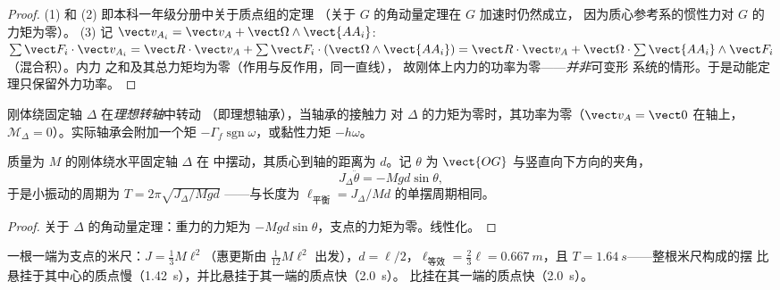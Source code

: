 \begin{proof}
(1) 和 (2) 即本科一年级分册中关于质点组的定理
（关于 $G$ 的角动量定理在 $G$ 加速时仍然成立，
因为质心参考系的惯性力对 $G$ 的力矩为零）。
(3) 记 $\vect v_{A_i} = \vect v_A + \vect\Omega
\wedge\vect{AA_i}$: $\sum\vect F_i\cdot\vect v_{A_i} = \vect R\cdot\vect v_A
+ \sum\vect F_i\cdot(\vect\Omega\wedge\vect{AA_i}) = \vect R\cdot\vect v_A +
\vect\Omega\cdot\sum\vect{AA_i}\wedge\vect F_i$（混合积）。内力
之和及其总力矩均为零（作用与反作用，同一直线），
故刚体上内力的功率为零——\emph{并非}可变形
系统的情形。于是动能定理只保留外力功率。
\end{proof}

\begin{definition}[理想转轴]\label{def:b2:rigid-body-mechanics:pivot}
刚体绕固定轴 $\Delta$ 在\emph{理想转轴}中转动
（即理想轴承），当轴承的接触力
对 $\Delta$ 的力矩为零时，其功率为零（$\vect v_A = \vect 0$
在轴上，$\mathcal M_\Delta = 0$）。实际轴承会附加一个矩 $-\Gamma_f\operatorname{sgn}\omega$，或黏性力矩 $-h\omega$。
\end{definition}

\begin{proposition}[物理摆]\label{prop:b2:rigid-body-mechanics:pendulum}
质量为 $M$ 的刚体绕水平固定轴 $\Delta$ 在
中摆动，其质心到轴的距离为 $d$。记
$\theta$ 为 $\vect{OG}$ 与竖直向下方向的夹角，
\[
J_\Delta\ddot\theta = -Mgd\sin\theta ,
\]
于是小振动的周期为 $T = 2\pi\sqrt{J_\Delta/Mgd}$
——与长度为 $\ell_{\text{平衡}} = J_\Delta/Md$ 的单摆周期相同。
\end{proposition}

\begin{proof}
关于 $\Delta$ 的角动量定理：重力的力矩为
$-Mgd\sin\theta$，支点的力矩为零。线性化。
\end{proof}

\begin{example}[米尺]\label{ex:b2:rigid-body-mechanics:rule}
一根一端为支点的米尺：$J = \tfrac13M\ell^2$（惠更斯由
$\tfrac1{12}M\ell^2$ 出发），$d = \ell/2$，$\ell_{\text{等效}} = \tfrac23\ell =
\qty{0.667}{m}$，且 $T = \qty{1.64}{s}$——整根米尺构成的摆
比悬挂于其中心的质点慢（\qty{1.42}{s}），并比悬挂于其一端的质点快（\qty{2.0}{s}）。
比挂在其一端的质点快（\qty{2.0}{s}）。
\end{example}

